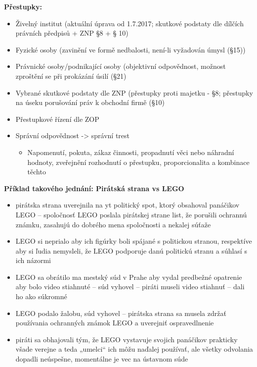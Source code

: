 \textbf{Přestupky:}
\begin{itemize}
    \item Živelný institut (aktuální úprava od 1.7.2017; skutkové podstaty dle dílčích právních předpisů + ZNP §8
    + § 10)
    \item Fyzické osoby (zavinění ve formě nedbalosti, není-li vyžadován úmysl (§15))
    \item Právnické osoby/podnikající osoby (objektivní odpovědnost, možnost zproštění se při prokázání úsilí
    (§21)
    \item Vybrané skutkové podstaty dle ZNP (přestupky proti majetku - §8; přestupky na úseku porušování práv
    k obchodní firmě (§10)
    \item Přestupkové řízení dle ZOP
    \item Správní odpovědnost -> správní trest
    \begin{itemize}
        \item Napomenutí, pokuta, zákaz činnosti, propadnutí věci nebo náhradní hodnoty, zveřejnění
rozhodnutí o přestupku, proporcionalita a kombinace těchto
    \end{itemize}
\end{itemize}
\textbf{Příklad takového jednání: Pirátská strana vs LEGO}
\begin{itemize}
    \item pirátska strana uverejnila na yt politický spot, ktorý obsahoval panáčikov
    LEGO – spoločnosť LEGO poslala pirátskej strane list, že porušili ochrannú
    známku, zasahujú do dobrého mena spoločnosti a nekalej súťaže
    \item  LEGO si neprialo aby ich figúrky boli spájané s politickou stranou,
    respektíve aby si ľudia nemysleli, že LEGO podporuje danú politickú stranu
    a súhlasí s ich názormi
    \item  LEGO sa obrátilo ma mestský súd v Prahe aby vydal predbežné opatrenie
    aby bolo video stiahnuté – súd vyhovel – piráti museli video stiahnuť – dali
    ho ako súkromné
    \item  LEGO podalo žalobu, súd vyhovel – pirátska strana sa musela zdržať
    používania ochranných známok LEGO a uverejniť ospravedlnenie
    \item  piráti sa obhajovali tým, že LEGO vystavuje svojich panáčikov prakticky
    všade verejne a teda „umelci“ ich môžu naďalej používať, ale všetky
    odvolania dopadli neúspešne, momentálne je vec na ústavnom súde

\end{itemize}

